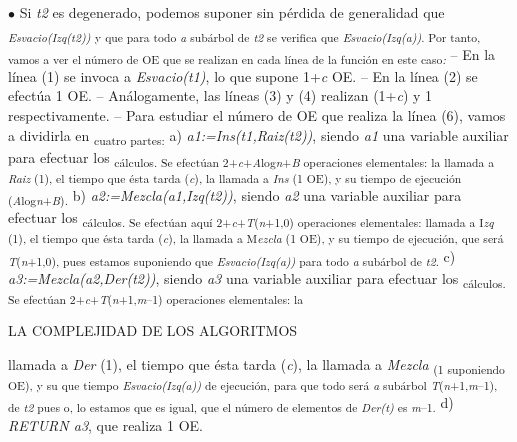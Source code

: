 \documentclass[12pt]{article}
\renewcommand{\_}{\kern-1.5pt\textunderscore\kern-1.5pt}
\begin{document}
\begin{adjustwidth}{0.57in}{0.57in}
{\fontsize{10pt}{12.0pt}\selectfont $\bullet$  Si \textit{t2 }es degenerado, podemos suponer sin pérdida de generalidad que \textit{\textsubscript{Esvacio(Izq(t2)) }}\textsubscript{y que para todo \textit{a }subárbol de \textit{t2 }se verifica que \textit{Esvacio(Izq(a))}. Por tanto, vamos a ver el número de OE que se realizan en cada línea de la función en este caso\textit{: }}– En la línea (1) se invoca a \textit{Esvacio(t1)}, lo que supone 1+\textit{c }OE. – En la línea (2) se efectúa 1 OE. – Análogamente, las líneas (3) y (4) realizan (1+\textit{c}) y 1 respectivamente. – Para estudiar el número de OE que realiza la línea (6), vamos a dividirla en \textsubscript{cuatro partes: }a) \textit{a1:=Ins(t1,Raiz(t2))}, siendo \textit{a1 }una variable auxiliar para efectuar los \textsubscript{cálculos. Se efectúan 2+\textit{c}+\textit{A}log\textit{n}+\textit{B }operaciones elementales: la llamada a \textit{Raiz }(1), el tiempo que ésta tarda (\textit{c}), la llamada a \textit{Ins }(1 OE), y su tiempo de ejecución (\textit{A}log\textit{n}+\textit{B})\textit{. }}b) \textit{a2:=Mezcla(a1,Izq(t2))}, siendo \textit{a2 }una variable auxiliar para efectuar los \textsubscript{cálculos. Se efectúan aquí 2+\textit{c}+\textit{T}(\textit{n}+1,0) operaciones elementales: llamada a I\textit{zq }(1), el tiempo que ésta tarda (\textit{c}), la llamada a M\textit{ezcla }(1 OE), y su tiempo de ejecución, que será \textit{T}(\textit{n}+1,0), pues estamos suponiendo que \textit{Esvacio(Izq(a)) }para todo \textit{a }subárbol de \textit{t2}. }c) \textit{a3:=Mezcla(a2,Der(t2))}, siendo \textit{a3 }una variable auxiliar para efectuar los \textsubscript{cálculos. Se efectúan 2+\textit{c}+\textit{T}(\textit{n}+1,\textit{m}–1) operaciones elementales: la }\par}\par

\end{adjustwidth}

{\fontsize{7pt}{8.4pt}\selectfont LA COMPLEJIDAD DE LOS ALGORITMOS {\fontsize{10pt}{12.0pt} \par}\par}\par

{\fontsize{10pt}{12.0pt}\selectfont llamada a \textit{Der }(1), el tiempo que ésta tarda (\textit{c}), la llamada a \textit{Mezcla }\textsubscript{(1 suponiendo OE), y su que tiempo \textit{Esvacio(Izq(a)) }de ejecución, para que todo será \textit{a }subárbol \textit{T}(\textit{n}+1,\textit{m}–1), de \textit{t2 }pues o, lo estamos que es igual, que el número de elementos de \textit{Der(t) }es \textit{m}–1. }d) \textit{RETURN a3}, que realiza 1 OE. \par}\par
\end{document}
